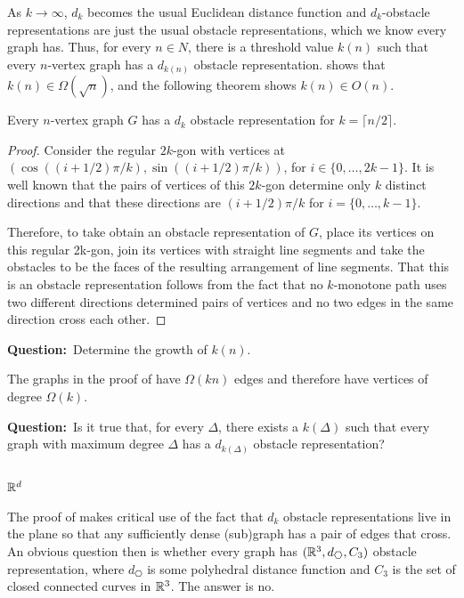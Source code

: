 \documentclass{patmorin}
\newcommand{\question}[1]{\textbf{\color{red}Question:}~#1}
\begin{document}
As $k\to\infty$, $d_k$ becomes the usual Euclidean distance function
and $d_k$-obstacle representations are just the usual obstacle
representations, which we know every graph has.  Thus, for every $n\in
N$, there is a threshold value $k(n)$ such that every $n$-vertex graph
has a $d_{k(n)}$ obstacle representation.  
shows that $k(n)\in \Omega(\sqrt{n})$, and the following theorem shows
$k(n)\in O(n)$.

\begin{thm}
   Every $n$-vertex graph $G$ has a $d_k$ obstacle representation for $k=\lceil n/2\rceil$.
\end{thm}

\begin{proof}
   Consider the regular $2k$-gon with vertices at $(\cos((i+1/2)\pi/k),
   \sin((i+1/2)\pi/k))$, for $i\in\{0,\ldots,2k-1\}$.  It is well known
   that the pairs of vertices of this $2k$-gon determine only $k$
   distinct directions and that these directions are $(i+1/2)\pi/k$
   for $i=\{0,\ldots,k-1\}$.

   Therefore, to take obtain an obstacle representation of $G$, place
   its vertices on this regular 2k-gon, join its vertices with straight
   line segments and take the obstacles to be the faces of the resulting
   arrangement of line segments.  That this is an obstacle representation
   follows from the fact that no $k$-monotone path uses two different
   directions determined pairs of vertices and no two edges in the same
   direction cross each other.
\end{proof}

\question{Determine the growth of $k(n)$.}

The graphs in the proof of  have $\Omega(kn)$
edges and therefore have vertices of degree $\Omega(k)$.  

\question{Is it true that, for every $\Delta$, there exists a $k(\Delta)$ such that every graph with maximum degree $\Delta$ has a $d_{k(\Delta)}$ obstacle representation?}


\subsection{$\mathbb{R}^d$}

The proof of  makes critical use of the
fact that $d_k$ obstacle representations live in the plane so that
any sufficiently dense (sub)graph has a pair of edges that cross. An
obvious question then is whether every graph has $(\R^3,d_{\hexagon},C_3)$
obstacle representation, where $d_{\hexagon}$ is some polyhedral distance
function and $C_3$ is the set of closed connected curves in $\mathbb{R}^3$.
The answer is no.
\end{document}
